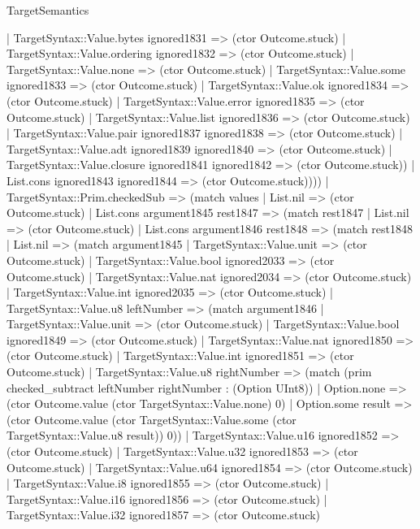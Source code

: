 \begin{lexlean}{TargetSemantics}
\begin{semanticmodule}
{            | TargetSyntax::Value.bytes ignored1831 => (ctor Outcome.stuck)
            | TargetSyntax::Value.ordering ignored1832 => (ctor Outcome.stuck)
            | TargetSyntax::Value.none => (ctor Outcome.stuck)
            | TargetSyntax::Value.some ignored1833 => (ctor Outcome.stuck)
            | TargetSyntax::Value.ok ignored1834 => (ctor Outcome.stuck)
            | TargetSyntax::Value.error ignored1835 => (ctor Outcome.stuck)
            | TargetSyntax::Value.list ignored1836 => (ctor Outcome.stuck)
            | TargetSyntax::Value.pair ignored1837 ignored1838 => (ctor Outcome.stuck)
            | TargetSyntax::Value.adt ignored1839 ignored1840 => (ctor Outcome.stuck)
            | TargetSyntax::Value.closure ignored1841 ignored1842 => (ctor Outcome.stuck))
          | List.cons ignored1843 ignored1844 => (ctor Outcome.stuck))))
    | TargetSyntax::Prim.checkedSub => (match values
      | List.nil => (ctor Outcome.stuck)
      | List.cons argument1845 rest1847 => (match rest1847
        | List.nil => (ctor Outcome.stuck)
        | List.cons argument1846 rest1848 => (match rest1848
          | List.nil => (match argument1845
            | TargetSyntax::Value.unit => (ctor Outcome.stuck)
            | TargetSyntax::Value.bool ignored2033 => (ctor Outcome.stuck)
            | TargetSyntax::Value.nat ignored2034 => (ctor Outcome.stuck)
            | TargetSyntax::Value.int ignored2035 => (ctor Outcome.stuck)
            | TargetSyntax::Value.u8 leftNumber => (match argument1846
              | TargetSyntax::Value.unit => (ctor Outcome.stuck)
              | TargetSyntax::Value.bool ignored1849 => (ctor Outcome.stuck)
              | TargetSyntax::Value.nat ignored1850 => (ctor Outcome.stuck)
              | TargetSyntax::Value.int ignored1851 => (ctor Outcome.stuck)
              | TargetSyntax::Value.u8 rightNumber => (match (prim checked_subtract leftNumber rightNumber : (Option UInt8))
                | Option.none => (ctor Outcome.value (ctor TargetSyntax::Value.none) 0)
                | Option.some result => (ctor Outcome.value (ctor TargetSyntax::Value.some (ctor TargetSyntax::Value.u8 result)) 0))
              | TargetSyntax::Value.u16 ignored1852 => (ctor Outcome.stuck)
              | TargetSyntax::Value.u32 ignored1853 => (ctor Outcome.stuck)
              | TargetSyntax::Value.u64 ignored1854 => (ctor Outcome.stuck)
              | TargetSyntax::Value.i8 ignored1855 => (ctor Outcome.stuck)
              | TargetSyntax::Value.i16 ignored1856 => (ctor Outcome.stuck)
              | TargetSyntax::Value.i32 ignored1857 => (ctor Outcome.stuck)
}
\end{semanticmodule}
\end{lexlean}
